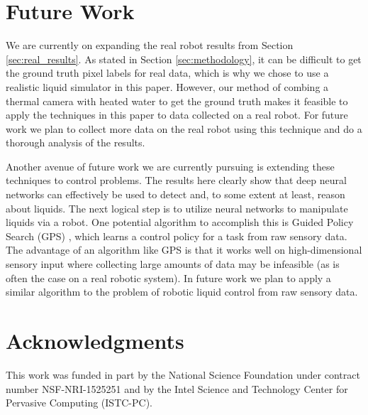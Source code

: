 \documentclass[runningheads,a4paper]{llncs}
\begin{document}
\vspace{-0.5cm}
\section{Future Work}
\label{sec:future_work}
\vspace{-0.5cm}

We are currently on expanding the real robot results from Section \ref{sec:real_results}.
As stated in Section \ref{sec:methodology}, it can be difficult to get the ground truth pixel labels for real data, which is why we chose to use a realistic liquid simulator in this paper. 
However, our method of combing a thermal camera with heated water to get the ground truth makes it feasible to apply the techniques in this paper to data collected on a real robot.
For future work we plan to collect more data on the real robot using this technique and do a thorough analysis of the results.

Another avenue of future work we are currently pursuing is extending these techniques to control problems. 
The results here clearly show that deep neural networks can effectively be used to detect and, to some extent at least, reason about liquids.
The next logical step is to utilize neural networks to manipulate liquids via a robot.
One potential algorithm to accomplish this is Guided Policy Search (GPS) \cite{levine2013}, which learns a control policy for a task from raw sensory data.
The advantage of an algorithm like GPS is that it works well on high-dimensional sensory input where collecting large amounts of data may be infeasible (as is often the case on a real robotic system).
In future work we plan to apply a similar algorithm to the problem of robotic liquid control from raw sensory data.

\vspace{-0.5cm}
\section{Acknowledgments}
\vspace{-0.3cm}

This work was funded in part by the National Science Foundation under contract number NSF-NRI-1525251 and by the Intel Science and Technology Center for Pervasive Computing (ISTC-PC).


\vspace{-0.5cm}{\footnotesize 
}
\end{document}
